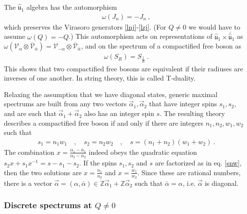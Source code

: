 \documentclass[12pt, a4paper, notitlepage, twoside]{report}
\numberwithin{equation}{section}
\theoremstyle{break}
\begin{document}
The $\hat{\mathfrak{u}}_1$ algebra has the automorphism
\begin{align}
 \omega(J_n) = -J_n \ ,
\end{align}
which preserves the Virasoro generators \eqref{lnj}-\eqref{lzj}. (For $Q\neq 0$ we would have to assume $\omega(Q)=-Q$.)
This automorphism acts on representations of $\hat{\mathfrak{u}}_1 \times \bar{\hat{\mathfrak{u}}}_1$ as $\omega(\mathcal{V}_\alpha \otimes \bar{\mathcal{V}}_{\bar{\alpha}}) =  \mathcal{V}_{-\alpha} \otimes \bar{\mathcal{V}}_{\bar{\alpha}}$, and on the spectrum of a compactified free boson as 
\begin{align}
 \omega(S_R) = S_{\frac{1}{R}}\ .
\end{align}
This shows that two compactified free bosons are equivalent if their radiuses are inverses of one another. In string theory, this is called T-duality.

Relaxing the assumption that we have diagonal states, generic maximal spectrums are built from any two vectors $\vec\alpha_1,\vec\alpha_2$ that have integer spins $s_1,s_2$, and are such that $\vec\alpha_1+\vec\alpha_2$ also has an integer spin $s$. The resulting theory describes a compactified free boson if and only if there are integers $n_1,n_2,w_1,w_2$ such that
\begin{align}
 s_1=n_1w_1 \quad , \quad s_2=n_2w_2 \quad ,\quad s = (n_1+n_2)(w_1+w_2)\ .
 \label{snw}
\end{align}
The combination $x=\frac{\alpha_1-\bar{\alpha}_1}{\alpha_2-\bar{\alpha}_2}$ indeed obeys the quadratic equation 
$
 s_2x+s_1x^{-1} = s-s_1-s_2 
$. If the spins $s_1,s_2$ and $s$ are factorized as in eq. \eqref{snw}, then the two solutions are $x=\frac{n_1}{n_2}$ and $x=\frac{w_1}{w_2}$. Since these are rational numbers, there is a vector $\vec \alpha = (\alpha,\bar\alpha)\in \mathbb{Z}\vec\alpha_1 + \mathbb{Z}\vec\alpha_2$ such that $\bar\alpha =\alpha$, i.e. $\vec\alpha$ is diagonal.


\subsubsection{Discrete spectrums at $Q\neq 0$}
\end{document}

